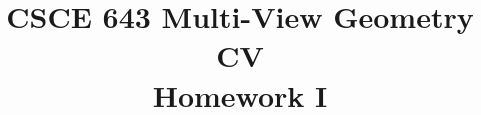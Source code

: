 \documentclass[conference]{IEEEtran}
\begin{document}
%
\title{CSCE 643 Multi-View Geometry CV\\
Homework I}




% 








\maketitle

\end{document}
